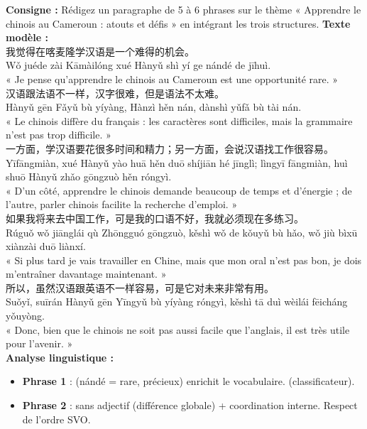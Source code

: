 \documentclass[11pt]{article}
\newcommand{\zh}[1]{\ifmmode\text{#1}\else{#1}\fi}
\begin{document}
\begin{exoresolu}
\textbf{Consigne :} Rédigez un paragraphe de 5 à 6 phrases sur le thème « Apprendre le chinois au Cameroun : atouts et défis » en intégrant les trois structures.
\tcblower
\textbf{Texte modèle :}\\[0.3em]
我觉得在喀麦隆学汉语是一个难得的机会。\\
Wǒ juéde zài Kāmàilóng xué Hànyǔ shì yí ge nándé de jīhuì.\\
« Je pense qu'apprendre le chinois au Cameroun est une opportunité rare. »\\[0.3em]
汉语跟法语不一样，汉字很难，但是语法不太难。\\
Hànyǔ gēn Fǎyǔ bù yíyàng, Hànzì hěn nán, dànshì yǔfǎ bù tài nán.\\
« Le chinois diffère du français : les caractères sont difficiles, mais la grammaire n'est pas trop difficile. »\\[0.3em]
一方面，学汉语要花很多时间和精力；另一方面，会说汉语找工作很容易。\\
Yīfāngmiàn, xué Hànyǔ yào huā hěn duō shíjiān hé jīnglì; lìngyī fāngmiàn, huì shuō Hànyǔ zhǎo gōngzuò hěn róngyì.\\
« D'un côté, apprendre le chinois demande beaucoup de temps et d'énergie ; de l'autre, parler chinois facilite la recherche d'emploi. »\\[0.3em]
如果我将来去中国工作，可是我的口语不好，我就必须现在多练习。\\
Rúguǒ wǒ jiānglái qù Zhōngguó gōngzuò, kěshì wǒ de kǒuyǔ bù hǎo, wǒ jiù bìxū xiànzài duō liànxí.\\
« Si plus tard je vais travailler en Chine, mais que mon oral n'est pas bon, je dois m'entraîner davantage maintenant. »\\[0.3em]
所以，虽然汉语跟英语不一样容易，可是它对未来非常有用。\\
Suǒyǐ, suīrán Hànyǔ gēn Yīngyǔ bù yíyàng róngyì, kěshì tā duì wèilái fēicháng yǒuyòng.\\
« Donc, bien que le chinois ne soit pas aussi facile que l'anglais, il est très utile pour l'avenir. »\\[0.5em]
\textbf{Analyse linguistique :}
\begin{itemize}
\item \textbf{Phrase 1} : \zh{难得} (nándé = rare, précieux) enrichit le vocabulaire. \zh{一个} (classificateur).
\item \textbf{Phrase 2} : \zh{不一样} sans adjectif (différence globale) + coordination \zh{但是} interne. Respect de l'ordre SVO.

\end{itemize}
\end{exoresolu}
\end{document}
